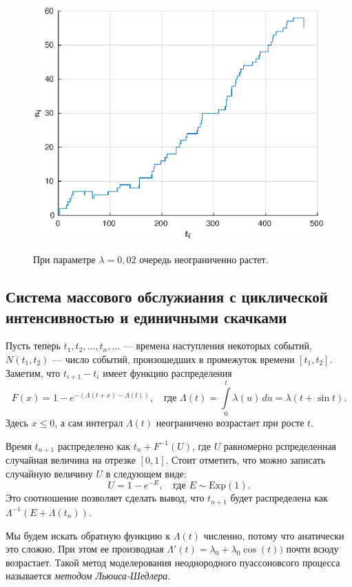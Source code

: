 \clearpage
\begin{figure}[t]
\noindent
        \centering
        {
        \includegraphics[width=120mm]{task_11/1-l-0-2.eps}}
        \caption{При параметре $\lambda =0,\!02$ очередь неограниченно растет.}
\end{figure}


\subsection{Система массового обслужиания с циклической интенсивностью и единичными скачками}

Пусть теперь $t_1,t_2,\ldots,t_n,\ldots$ --- времена наступления некоторых событий, $N(t_1,t_2)$ --- число событий, произошедших в промежуток времени $[t_1,t_2]$. Заметим, что $t_{i+1} - t_i$ имеет функцию распределения
$$
        F(x) = 1 - e^{-(\Lambda(t+x) - \Lambda(t))},
        \quad
        \mbox{где }
        \Lambda(t) = \int\limits_0^t\lambda(u)\,du = \lambda(t + \sin t).
$$
Здесь $x \leqslant 0$, а сам интеграл $\Lambda(t)$ неограничено возрастает при росте $t$.

Время $t_{n+1}$ распределено как $t_n + F^{-1}(U)$, где $U$ равномерно рспределенная случайная величина на отрезке $[0,1]$. Стоит отметить, что можно записать случайную величину $U$ в следующем виде:
$$
        U = 1 - e^{-E},
        \quad
        \mbox{где }
        E \sim
        \mathrm{Exp}(1). 
$$
Это соотношение позволяет сделать вывод, что $t_{n+1}$ будет распределена как $\Lambda^{-1}(E + \Lambda(t_n))$.

Мы будем искать обратную функцию к $\Lambda(t)$ численно, потому что анатически это сложно. При этом ее производная $\Lambda'(t)=\lambda_0+\lambda_0\cos(t))$ почти всюду возрастает. Такой метод моделерования неоднородного пуассоновсого процесса называется \textit{методом Льюиса-Шедлера}.

